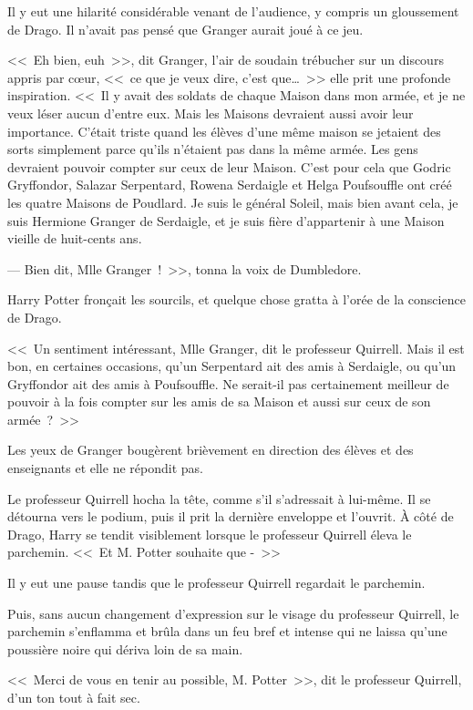 Il y eut une hilarité considérable venant de l'audience, y compris un gloussement de Drago. Il n'avait pas pensé que Granger aurait joué à ce jeu.

<<~Eh bien, euh~>>, dit Granger, l'air de soudain trébucher sur un discours appris par cœur, <<~ce que je veux dire, c'est que…~>> elle prit une profonde inspiration. <<~Il y avait des soldats de chaque Maison dans mon armée, et je ne veux léser aucun d'entre eux. Mais les Maisons devraient aussi avoir leur importance. C'était triste quand les élèves d'une même maison se jetaient des sorts simplement parce qu'ils n'étaient pas dans la même armée. Les gens devraient pouvoir compter sur ceux de leur Maison. C'est pour cela que Godric Gryffondor, Salazar Serpentard, Rowena Serdaigle et Helga Poufsouffle ont créé les quatre Maisons de Poudlard. Je suis le général Soleil, mais bien avant cela, je suis Hermione Granger de Serdaigle, et je suis fière d'appartenir à une Maison vieille de huit-cents ans.

--- Bien dit, Mlle Granger~!~>>, tonna la voix de Dumbledore.

Harry Potter fronçait les sourcils, et quelque chose gratta à l'orée de la conscience de Drago.

<<~Un sentiment intéressant, Mlle Granger, dit le professeur Quirrell. Mais il est bon, en certaines occasions, qu'un Serpentard ait des amis à Serdaigle, ou qu'un Gryffondor ait des amis à Poufsouffle. Ne serait-il pas certainement meilleur de pouvoir à la fois compter sur les amis de sa Maison et aussi sur ceux de son armée~?~>>

Les yeux de Granger bougèrent brièvement en direction des élèves et des enseignants et elle ne répondit pas.

Le professeur Quirrell hocha la tête, comme s'il s'adressait à lui-même. Il se détourna vers le podium, puis il prit la dernière enveloppe et l'ouvrit. À côté de Drago, Harry se tendit visiblement lorsque le professeur Quirrell éleva le parchemin. <<~Et M. Potter souhaite que -~>>

Il y eut une pause tandis que le professeur Quirrell regardait le parchemin.

Puis, sans aucun changement d'expression sur le visage du professeur Quirrell, le parchemin s'enflamma et brûla dans un feu bref et intense qui ne laissa qu'une poussière noire qui dériva loin de sa main.

<<~Merci de vous en tenir au possible, M. Potter~>>, dit le professeur Quirrell, d'un ton tout à fait sec.


